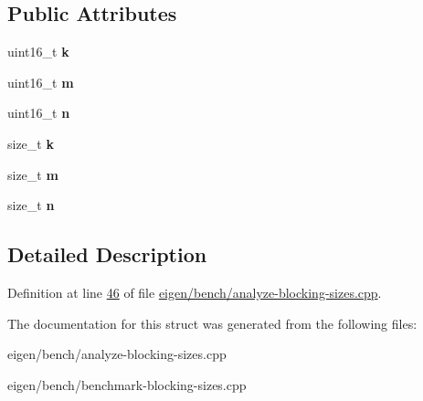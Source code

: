 \subsection*{Public Attributes}
\begin{DoxyCompactItemize}
\item 
\mbox{\label{structsize__triple__t_a5a04fa7a18fefe8656918455b6915a88}} 
uint16\+\_\+t {\bfseries k}
\item 
\mbox{\label{structsize__triple__t_a2ec6e2691547d4bc90da3a4c733e9f58}} 
uint16\+\_\+t {\bfseries m}
\item 
\mbox{\label{structsize__triple__t_ac70d007b4aa0fa5f576afb33b4e2b470}} 
uint16\+\_\+t {\bfseries n}
\item 
\mbox{\label{structsize__triple__t_a5a04fa7a18fefe8656918455b6915a88}} 
size\+\_\+t {\bfseries k}
\item 
\mbox{\label{structsize__triple__t_a2ec6e2691547d4bc90da3a4c733e9f58}} 
size\+\_\+t {\bfseries m}
\item 
\mbox{\label{structsize__triple__t_ac70d007b4aa0fa5f576afb33b4e2b470}} 
size\+\_\+t {\bfseries n}
\end{DoxyCompactItemize}


\subsection{Detailed Description}


Definition at line \hyperlink{eigen_2bench_2analyze-blocking-sizes_8cpp_source_l00046}{46} of file \hyperlink{eigen_2bench_2analyze-blocking-sizes_8cpp_source}{eigen/bench/analyze-\/blocking-\/sizes.\+cpp}.



The documentation for this struct was generated from the following files\+:\begin{DoxyCompactItemize}
\item 
eigen/bench/analyze-\/blocking-\/sizes.\+cpp\item 
eigen/bench/benchmark-\/blocking-\/sizes.\+cpp\end{DoxyCompactItemize}
